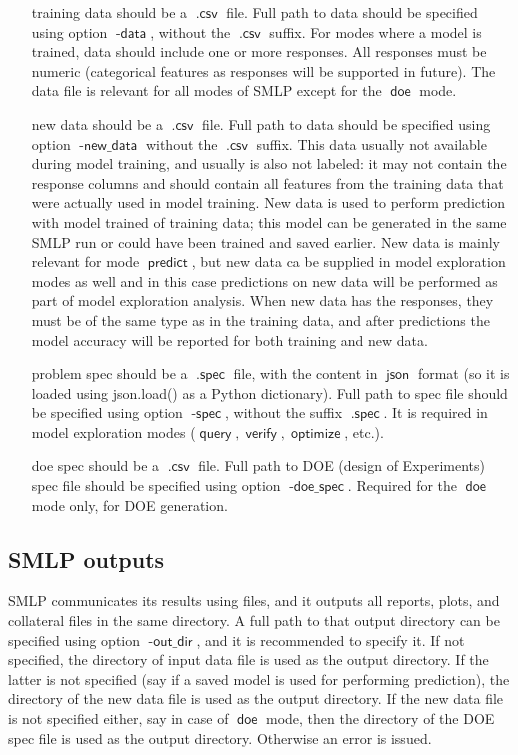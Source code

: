 \documentclass[a4paper,parskip=half]{article} %
\newcommand*\option[1]{\operatorname{\mathsf{#1}}} %
\newcommand*\suffix[1]{\operatorname{\mathsf{#1}}} %
\newcommand*\mode[1]{\operatorname{\mathsf{#1}}} %
\begin{document}
\begin{itemize}
\item[training data] should be a $\suffix{.csv}$ file. Full path to data should be specified using option $\option{-data}$, 
without the $\suffix{.csv}$ suffix. For modes where a model is trained, data should include one or more responses.
All responses must be numeric (categorical features as responses will be supported in future). 
The data file is relevant for all modes of SMLP except for the $\mode{doe}$ mode.
\item [new data] should be a $\suffix{.csv}$ file. Full path to data should be specified using option $\option{-new\_data}$
without the $\suffix{.csv}$ suffix. This data usually not available during model training, and usually is also not labeled:
it may not contain the response columns and should contain all features from the training data that were actually used in model training.
New data is used to perform prediction with model trained of training data; this model can be generated in the same SMLP
run or could have been trained and saved earlier. New data is mainly relevant for mode $\mode{predict}$, but new data
ca be supplied in model exploration modes as well and in this case predictions on new data will be performed as part of
model exploration analysis. When new data has the responses, they must be of the same type as in the training data, 
and after predictions the model accuracy will be reported for both training and new data.
\item [problem spec] should be  a $\suffix{.spec}$ file, with the content in $\suffix{json}$ format (so it is loaded using json.load() 
as a Python dictionary). Full path to spec file should be specified using option $\option{-spec}$, without the suffix 
$\suffix{.spec}$. It is required in model exploration modes ($\mode{query}, \mode{verify}, \mode{optimize}$, etc.).
\item[doe spec] should be a $\suffix{.csv}$ file. Full path to DOE (design of Experiments) spec file should be specified 
using option $\option{-doe\_spec}$. Required for the $\mode{doe}$ mode only, for DOE generation.
\end{itemize}

\subsection{SMLP outputs}\label{sec:smlp:outputs}

SMLP communicates its results using files, and it outputs all reports, plots, and collateral files in the same directory.
A full path to that output directory can be specified using option $\option{-out\_dir}$, and it is recommended to specify it.
If not specified, the directory of input data file is used as the output directory. 
If the latter is not specified (say if a saved model is used for performing prediction), the directory of the new data 
file is used as the output directory. If the new data file is not specified either, say in case of $\mode{doe}$ mode, 
then the directory of the DOE spec file is used as the output directory. Otherwise an error is issued.
\end{document}
